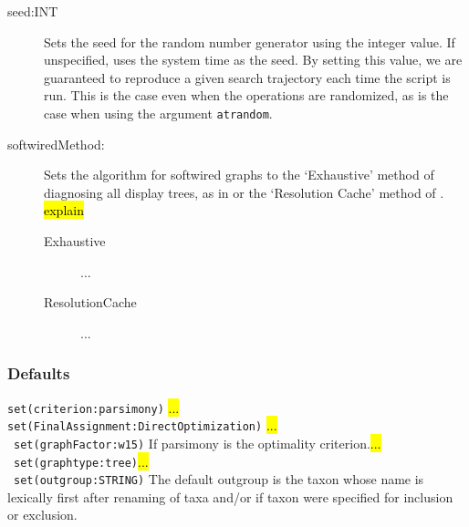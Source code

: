 \begin{description}
\begin{description}
			
			\end{description}
			 
		 \item[seed:INT] Sets the seed for the random number generator using the integer
		 value. If unspecified, \phyg uses the system time as the seed. By setting this value, 
		 we are guaranteed to reproduce a given search trajectory each time the script is run. 
		 This is the case even when the operations are randomized, as is the case when using 
		 the argument \texttt{atrandom}.
			 
		 \item[softwiredMethod:] Sets the algorithm for softwired graphs to the 
		 `Exhaustive' method of diagnosing all display trees, as in \cite{Wheeler2015} or
		 the `Resolution Cache' method of \cite{WheelerandWashburn2023}.
		 \hl{explain}  
				
			\begin{description}
			\item[Exhaustive] ...	
			
			\item[ResolutionCache] ...	
			
			\end{description}
			
		\end{description}
					
	\subsubsection{Defaults} 
		\texttt{set(criterion:parsimony)} \hl{...}\\
		\texttt{set(FinalAssignment:DirectOptimization)} \hl{...}\\\
		\texttt{set(graphFactor:w15)}  If parsimony is the optimality criterion.\hl{...}\\\
		\texttt{set(graphtype:tree)}\hl{...}\\\
		\texttt{set(outgroup:STRING)} The default outgroup is the taxon whose name is 
		lexically first after renaming of taxa and/or if taxon were specified for inclusion or
		exclusion. 
		
		
